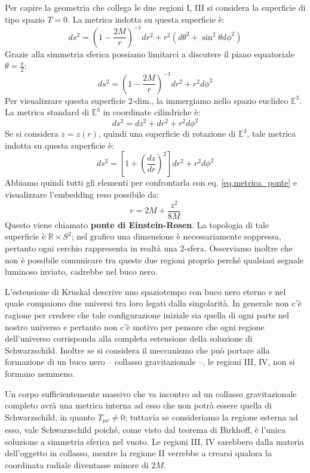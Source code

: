 Per capire la geometria che collega le due regioni I, III si considera la superficie di tipo spazio $T=0$.
La metrica indotta su questa superficie è:
\begin{equation*}
    ds^2 = \left( 1- \frac{2M}{r}\right)^{-1} dr^2 + r^2(d\theta^2 + \sin^2\theta d\phi^2)
\end{equation*}
Grazie alla simmetria sferica possiamo limitarci a discutere il piano equatoriale $\theta= \frac{\pi}{2}$:
\begin{equation}
    ds^2 = \left( 1- \frac{2M}{r}\right)^{-1} dr^2 +r^2 d\phi^2
    \label{eq.metrica_ponte}
\end{equation}
Per visualizzare questa superficie 2-dim., la immergiamo nello spazio euclideo $\mathbb{E}^3$. La metrica standard di $\mathbb{E}^3$ in coordinate cilindriche è:
\begin{equation*}
    ds^2 = dz^2 +dr^2 +r^2d\phi^2
\end{equation*}
Se si considera $z=z(r)$, quindi una superficie di rotazione di $\mathbb{E}^3$, tale metrica indotta su questa superficie è:
\begin{equation*}
    ds^2 = \left[ 1+ \left( \frac{dz}{dr}\right)^2 \right]dr^2 +r^2d\phi^2
\end{equation*}
Abbiamo quindi tutti gli elementi per confrontarla con eq. \ref{eq.metrica_ponte} e visualizzare l'embedding reso possibile da:
\begin{equation*}
    r= 2M + \frac{z^2}{8M}
\end{equation*}
Questo viene chiamato \textbf{ponte di Einstein-Rosen}.
La topologia di tale superficie è $\mathbb{R}\times S^2$; nel grafico una dimensione è necessariamente soppressa, pertanto ogni cerchio rappresenta in realtà una 2-sfera.
Osserviamo inoltre che non è possibile comunicare tra queste due regioni proprio perché qualsiasi segnale luminoso inviato, cadrebbe nel buco nero.

L'estensione di Kruskal descrive uno spaziotempo con buco nero eterno e nel quale compaiono due universi tra loro legati dalla singolarità. In generale non c'è ragione per credere che tale configurazione iniziale sia quella di ogni parte nel nostro universo e pertanto non c'è motivo per pensare che ogni regione dell'universo corrisponda alla completa estensione della soluzione di Schwarzschild. Inoltre se si considera il meccanismo che può portare alla formazione di un buco nero -- collasso gravitazionale --, le regioni III, IV, non si formano nemmeno.

Un corpo sufficientemente massivo che va incontro ad un collasso gravitazionale completo avrà una metrica interna ad esso che non potrà essere quella di Schwarzschild, in quanto $T_{\mu\nu}\neq 0$; tuttavia se consideriamo la regione esterna ad esso, vale Schwarzschild poiché, come visto dal teorema di Birkhoff, è l'unica soluzione a simmetria sferica nel vuoto. Le regioni III, IV sarebbero  dalla materia dell'oggetto in collasso, mentre la regione II verrebbe a crearsi qualora la coordinata radiale diventasse minore di $2M$.

